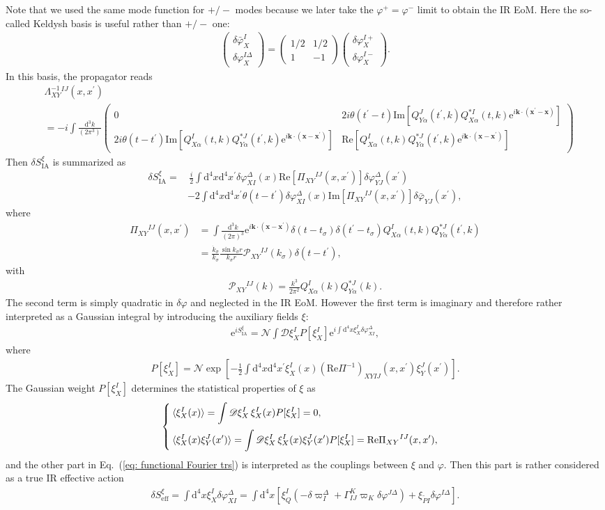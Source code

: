 \documentclass[aps, prd
, preprint
, nofootinbib 
, longbibliography
]{revtex4-1}
\newcommand{\dd}{\mathrm{d}}
\newcommand{\ee}{\mathrm{e}}
\renewcommand{\Re}{\mathrm{Re}}
\renewcommand{\Im}{\mathrm{Im}}
\newcommand{\dk}{\frac{\dd^3k}{(2\pi)^3}}
\newcommand{\dps}{\displaystyle}
\newcommand{\eff}{\mathrm{eff}}
\newcommand{\IA}{\mathrm{IA}}
\newcommand{\scrD}{\mathscr{D}}
\newcommand{\calN}{\mathcal{N}}
\newcommand{\calP}{\mathcal{P}}
\newcommand{\bae}[1]{\begin{align} #1 \end{align}}
\newcommand{\bce}[1]{\begin{cases} #1 \end{cases}}
\newcommand{\bpme}[1]{\begin{pmatrix} #1 \end{pmatrix}}
\begin{document}
Note that we used the same mode function for $+/-$ modes because we later take the $\varphi^+=\varphi^-$ limit to obtain the IR EoM. 
Here the so-called Keldysh basis is useful rather than $+/-$ one:
\bae{
	\bpme{
		\delta\bar{\varphi}_X^I \\
		\delta\varphi_X^{I\Delta}
	} = \bpme{
		1/2 & 1/2 \\
		1 & -1
	}\bpme{
		\delta\varphi_X^{I+} \\
		\delta\varphi_X^{I-}
	}.
}
In this basis, the propagator reads
\bae{
    &\Lambda^{-1}_{XY}{}^{IJ}(x,x^\prime) \nonumber \\
    &=-i\int\frac{\dd^3k}{(2\pi^3)}\bpme{
        0 & 2i\theta(t^\prime-t)\Im[Q_{Y\alpha}^J(t^\prime,k)Q_{X\alpha}^{*I}(t,k)\ee^{i\mathbf{k}\cdot(\mathbf{x}^\prime-\mathbf{x})}] \\
        2i\theta(t-t^\prime)\Im[Q_{X\alpha}^I(t,k)Q_{Y\alpha}^{*J}(t^\prime,k)\ee^{i\mathbf{k}\cdot(\mathbf{x}-\mathbf{x}^\prime)}] & \Re[Q_{X\alpha}^I(t,k)Q_{Y\alpha}^{*J}(t^\prime,k)\ee^{i\mathbf{k}\cdot(\mathbf{x}-\mathbf{x}^\prime)}]
    }
}
Then $\delta S_\IA^\xi$ is summarized as
\bae{
	\delta S_\IA^\xi=&\,\frac{i}{2}\int\dd^4x\dd^4x^\prime\delta\varphi_{XI}^\Delta(x)\Re[\Pi_{XY}{}^{IJ}(x,x^\prime)]\delta\varphi_{YJ}^\Delta(x^\prime) \nonumber \\
	&-2\int\dd^4x\dd^4x^\prime\theta(t-t^\prime)\delta\varphi_{XI}^\Delta(x)\Im[\Pi_{XY}{}^{IJ}(x,x^\prime)]\delta\bar{\varphi}_{YJ}(x^\prime),
}
where
\bae{
	\Pi_{XY}{}^{IJ}(x,x^\prime)&=\int\dk\ee^{i\mathbf{k}\cdot(\mathbf{x}-\mathbf{x}^\prime)}\delta(t-t_\sigma)\delta(t^\prime-t_\sigma)
	Q_{X\alpha}^I(t,k)Q^{*J}_{Y\alpha}(t^\prime,k) \nonumber \\
	&=\frac{\dot{k}_\sigma}{k_\sigma}\frac{\sin k_\sigma r}{k_\sigma r}\calP_{XY}{}^{IJ}(k_\sigma)\delta(t-t^\prime),
}
with
\bae{\label{eq: calP}
	\calP_{XY}{}^{IJ}(k)=\frac{k^3}{2\pi^2}Q_{X\alpha}^I(k)Q_{Y\alpha}^{*J}(k).
}
The second term is simply quadratic in $\delta\varphi$ and neglected in the IR EoM. However the first term is imaginary and therefore rather interpreted as a Gaussian integral
by introducing the auxiliary fields $\xi$:
\bae{\label{eq: functional Fourier trs}
	\ee^{iS_\IA^\xi}=\calN\int\scrD\xi_X^IP[\xi_X^I]\ee^{i\int\dd^4x\xi_X^I\delta\varphi_{XI}^\Delta},
}
where
\bae{
	P[\xi_X^I]=\calN\exp\left[-\frac{1}{2}\int\dd^4x\dd^4x^\prime\xi_{X}^I(x)(\Re\Pi^{-1})_{XYIJ}(x,x^\prime)\xi_Y^J(x^\prime)\right].
}
The Gaussian weight $P[\xi_X^I]$ determines the statistical properties of $\xi$ as
\bae{
	\bce{
		\dps
		\braket{\xi_X^I(x)}=\int\scrD\xi_X^I\,\xi_X^I(x)P[\xi_X^I]=0, \\[10pt]
		\dps
		\braket{\xi_X^I(x)\xi_{Y}^J(x^\prime)}=\int\scrD\xi_X^I\,\xi_X^I(x)\xi_{Y}^J(x^\prime)P[\xi_X^I]=\Re\Pi_{XY}{}^{IJ}(x,x^\prime),
	}
}
and the other part in Eq.~(\ref{eq: functional Fourier trs}) is interpreted as the couplings between $\xi$ and $\varphi$.
Then this part is rather considered as a true IR effective action
\bae{
	\delta S_\eff^\xi=\int\dd^4x\xi_X^I\delta\varphi_{XI}^\Delta=\int\dd^4x\left[\xi_Q^I(-\delta\varpi_I^\Delta+\Gamma^K_{IJ}\varpi_K\delta\varphi^{J\Delta})
	+\xi_{\tilde{P}I}\delta\varphi^{I\Delta}\right].
}
\end{document}
